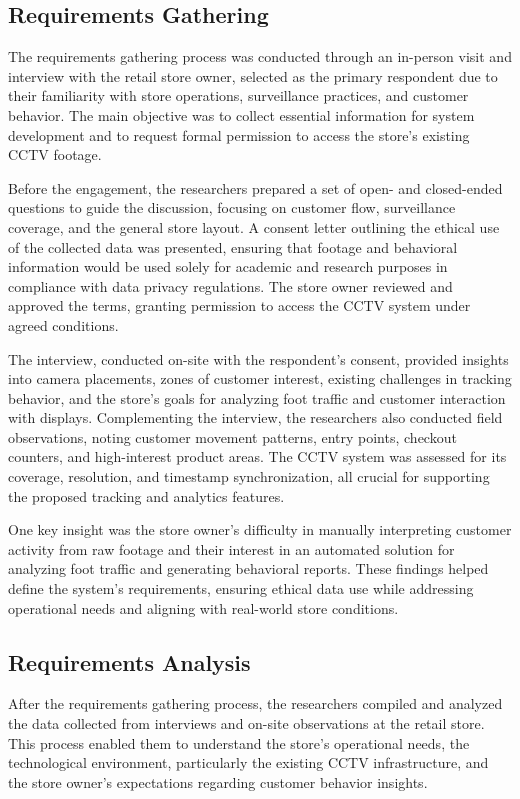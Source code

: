 {\subsection{Requirements Gathering}
The requirements gathering process was conducted through an in-person visit and interview with the retail store owner, selected as the primary respondent due to their familiarity with store operations, surveillance practices, and customer behavior. The main objective was to collect essential information for system development and to request formal permission to access the store’s existing CCTV footage.

Before the engagement, the researchers prepared a set of open- and closed-ended questions to guide the discussion, focusing on customer flow, surveillance coverage, and the general store layout. A consent letter outlining the ethical use of the collected data was presented, ensuring that footage and behavioral information would be used solely for academic and research purposes in compliance with data privacy regulations. The store owner reviewed and approved the terms, granting permission to access the CCTV system under agreed conditions.

The interview, conducted on-site with the respondent’s consent, provided insights into camera placements, zones of customer interest, existing challenges in tracking behavior, and the store’s goals for analyzing foot traffic and customer interaction with displays. Complementing the interview, the researchers also conducted field observations, noting customer movement patterns, entry points, checkout counters, and high-interest product areas. The CCTV system was assessed for its coverage, resolution, and timestamp synchronization, all crucial for supporting the proposed tracking and analytics features.

One key insight was the store owner's difficulty in manually interpreting customer activity from raw footage and their interest in an automated solution for analyzing foot traffic and generating behavioral reports. These findings helped define the system’s requirements, ensuring ethical data use while addressing operational needs and aligning with real-world store conditions.

\subsection{Requirements Analysis}
After the requirements gathering process, the researchers compiled and analyzed the data collected from interviews and on-site observations at the retail store. This process enabled them to understand the store’s operational needs, the technological environment, particularly the existing CCTV infrastructure, and the store owner's expectations regarding customer behavior insights.

}
